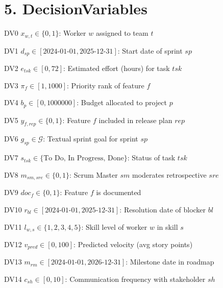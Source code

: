 \documentclass[12pt]{article}
\begin{document}
\section{5. DecisionVariables}
\item[DV0] $ x_{w,t} \in \{0,1\} $: Worker $ w $ assigned to team $ t $
    \item[DV1] $ d_{sp} \in [\text{2024-01-01}, \text{2025-12-31}] $: Start date of sprint $ sp $
    \item[DV2] $ e_{tsk} \in [0, 72] $: Estimated effort (hours) for task $ tsk $
    \item[DV3] $ \pi_f \in [1, 1000] $: Priority rank of feature $ f $
    \item[DV4] $ b_p \in [0, 1000000] $: Budget allocated to project $ p $
    \item[DV5] $ y_{f,rep} \in \{0,1\} $: Feature $ f $ included in release plan $ rep $
    \item[DV6] $ g_{sp} \in \mathcal{G} $: Textual sprint goal for sprint $ sp $
    \item[DV7] $ s_{tsk} \in \{\text{To Do, In Progress, Done}\} $: Status of task $ tsk $
    \item[DV8] $ m_{sm,sre} \in \{0,1\} $: Scrum Master $ sm $ moderates retrospective $ sre $
    \item[DV9] $ doc_f \in \{0,1\} $: Feature $ f $ is documented
    \item[DV10] $ r_{bl} \in [\text{2024-01-01}, \text{2025-12-31}] $: Resolution date of blocker $ bl $
    \item[DV11] $ l_{w,s} \in \{1,2,3,4,5\} $: Skill level of worker $ w $ in skill $ s $
    \item[DV12] $ v_{pred} \in [0, 100] $: Predicted velocity (avg story points)
    \item[DV13] $ m_{rm} \in [\text{2024-01-01}, \text{2026-12-31}] $: Milestone date in roadmap
    \item[DV14] $ c_{sh} \in [0,10] $: Communication frequency with stakeholder $ sh $
\end{document}
